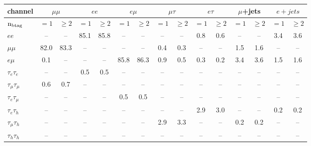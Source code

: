 
\begin{sidewaystable}[]
    \centering
    \setlength{\tabcolsep}{0.4em}
    \renewcommand{\arraystretch}{1.5}
    \begin{tabular}{l|cc|cc|cc|cc|cc|cc|cc}
    \hline
    channel                & \multicolumn{2}{c|}{$\mu\mu$} & \multicolumn{2}{|c|}{$ee$} & \multicolumn{2}{|c|}{$e\mu$} & \multicolumn{2}{|c|}{$\mu\tau$} & \multicolumn{2}{|c|}{$e\tau$} & \multicolumn{2}{|c|}{$\mu$+jets} & \multicolumn{2}{|c}{$e+jets$} \\
    \hline
    $\rm n_{b tag}$        & $=1$ & $\geq 2$ & $=1$ & $\geq 2$ & $=1$ & $\geq 2$ & $=1$ & $\geq 2$ & $=1$ & $\geq 2$ & $=1$ & $\geq 2$ & $=1$ & $\geq 2$ \\
    \hline                                                                                                                               
    $ee$                   & --   & --       & 85.1 & 85.8     & --   & --       & --   & --       & 0.8  & 0.6      & --   & --       & 3.4  & 3.6      \\
    $\mu\mu$               & 82.0 & 83.3     & --   & --       & --   & --       & 0.4  & 0.3      & --   & --       & 1.5  & 1.6      & --   & --       \\
    $e\mu$                 & 0.1  & --       & --   & --       & 85.8 & 86.3     & 0.9  & 0.5      & 0.3  & 0.2      & 3.4  & 3.6      & 1.5  & 1.6      \\
    $\tau_{e}\tau_{e}$     & --   & --       & 0.5  & 0.5      & --   & --       & --   & --       & --   & --       & --   & --       & --   & --       \\
    $\tau_{\mu}\tau_{\mu}$ & 0.6  & 0.7      & --   & --       & --   & --       & --   & --       & --   & --       & --   & --       & --   & --       \\
    $\tau_{e}\tau_{\mu}$   & --   & --       & --   & --       & 0.5  & 0.5      & --   & --       & --   & --       & --   & --       & --   & --       \\
    $\tau_{e}\tau_{h}$     & --   & --       & --   & --       & --   & --       & --   & --       & 2.9  & 3.0      & --   & --       & 0.2  & 0.2      \\
    $\tau_{\mu}\tau_{h}$   & --   & --       & --   & --       & --   & --       & 2.9  & 3.3      & --   & --       & 0.2  & 0.2      & --   & --       \\
    $\tau_{h}\tau_{h}$     & --   & --       & --   & --       & --   & --       & --   & --       & --   & --       & --   & --       & --   & --       \\

\end{tabular}
\end{sidewaystable}

